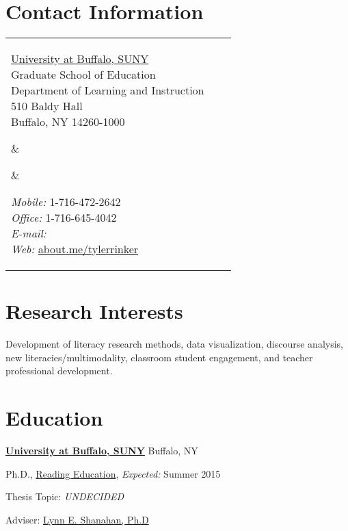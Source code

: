 


\section{Contact Information}


\newlength{\rcollength}\setlength{\rcollength}{2.1in}%
\newlength{\spacewidth}\setlength{\spacewidth}{20pt}
\begin{tabular}[t]{@{}p{\textwidth-\rcollength-\spacewidth}@{}p{\spacewidth}@{}p{\rcollength}}%

\parbox{\textwidth-\rcollength-\spacewidth}{%
\href{http://www.buffalo.edu/}{University at Buffalo, SUNY}\\
Graduate School of Education\\
Department of Learning and Instruction\\	
510 Baldy Hall\\
Buffalo, NY 14260-1000\\}

&
\parbox[m][5\baselineskip]{\spacewidth}{} &

\parbox{\rcollength}{%
\textit{Mobile:} 1-716-472-2642 \\
\textit{Office:} 1-716-645-4042 \\
\textit{E-mail:} \\
\textit{Web:} \href{http://about.me/tylerrinker}{about.me/tylerrinker}}

\end{tabular}

\section{Research Interests}

Development of literacy research methods, data visualization, discourse analysis, new literacies/multimodality, classroom student engagement, and teacher professional development.

\section{Education}

\href{http://www.buffalo.edu/}{\textbf{University at Buffalo, SUNY}}
Buffalo, NY
\begin{outerlist}

\item[] Ph.D.,
        \href{http://gse.buffalo.edu/lai/doc}
             {Reading Education},
             \emph{Expected:} Summer 2015
        \begin{innerlist}
        \item Thesis Topic: \emph{UNDECIDED}
        \item Adviser:
              \href{http://gse.buffalo.edu/about/directory/faculty/2110}
                   {Lynn E. Shanahan, Ph.D}
        \end{innerlist}
\end{outerlist}
\vspace{.1in}

